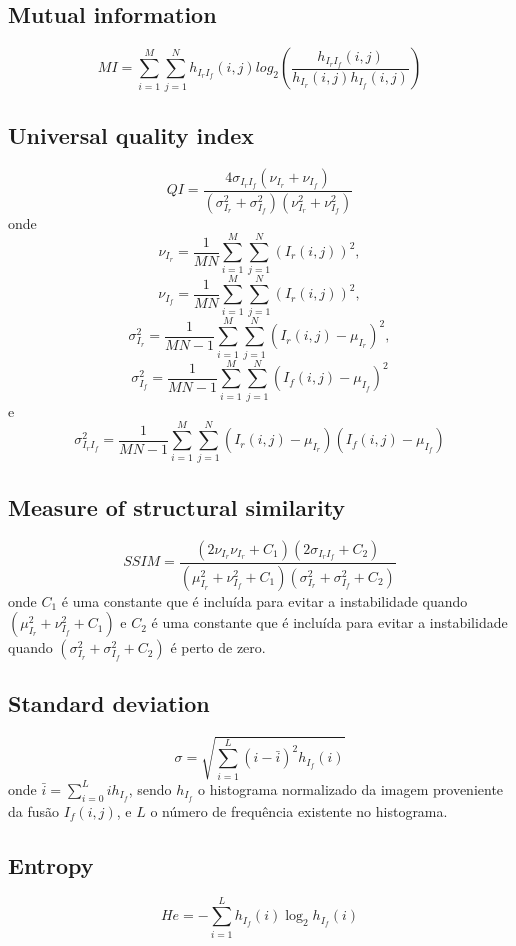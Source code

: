 \documentclass[conference]{IEEEtran}
\begin{document}
\subsection{Mutual information}
\begin{equation}
MI = \sum_{i=1}^M\sum_{j=1}^N h_{I_rI_f}(i,j){log_2\left(\frac{h_{I_rI_f}(i,j)}{h_{I_r}(i,j)h_{I_f}(i,j)}\right)}
\end{equation}
\subsection{Universal quality index}
\begin{equation}
QI=\frac{4\sigma_{I_rI_f}(\nu_{I_r}+\nu_{I_f})}{(\sigma_{I_r}^2+\sigma_{I_f}^2)(\nu_{I_r}^2+\nu_{I_f}^2)}
\end{equation}
onde 
$$\nu_{I_r}=\frac{1}{MN}\sum_{i=1}^M\sum_{j=1}^N(I_r(i,j))^2,$$
$$\nu_{I_f}=\frac{1}{MN}\sum_{i=1}^M\sum_{j=1}^N(I_r(i,j))^2,$$ $$\sigma_{I_r}^2=\frac{1}{MN-1}\sum_{i=1}^M\sum_{j=1}^N(I_r(i,j)-\mu_{I_r})^2,$$
$$\sigma_{I_f}^2   =\frac{1}{MN-1}\sum_{i=1}^M\sum_{j=1}^N(I_f(i,j)-\mu_{I_f})^2$$ e
$$\sigma_{I_rI_f}^2=\frac{1}{MN-1}\sum_{i=1}^M\sum_{j=1}^N(I_r(i,j)-\mu_{I_r})(I_f(i,j)-\mu_{I_f})$$ 
\subsection{Measure of structural similarity}
\begin{equation}
SSIM=\frac{(2\nu_{I_r}\nu_{I_r}+C_1)(2\sigma_{I_rI_f}+C_2)}{(\mu_{I_r}^2+\nu_{I_f}^2+C_1)(\sigma_{I_r}^2+\sigma_{I_f}^2+C_2)}
\end{equation}
onde $C_1$ é uma constante que é incluída para evitar a instabilidade quando $(\mu_{I_r}^2+\nu_{I_f}^2+C_1)$ e $C_2$ é uma constante que é incluída para evitar a instabilidade quando $(\sigma_{I_r}^2+\sigma_{I_f}^2+C_2)$ é perto de zero.
\subsection{Standard deviation}
\begin{equation}
\sigma=\sqrt{\sum_{i=1}^L(i-\bar{i})^2h_{I_f}(i)}
\end{equation}
onde $\bar{i}=\sum_{i=0}^Lih_{I_f}$, sendo $h_{I_f}$ o histograma normalizado da imagem proveniente da fusão $I_f(i,j)$, e $L$ o número de frequência existente no histograma.
\subsection{Entropy}
\begin{equation}
He=-\sum_{i=1}^Lh_{I_f}(i)\log_2 h_{I_f}(i)
\end{equation}
\end{document}
